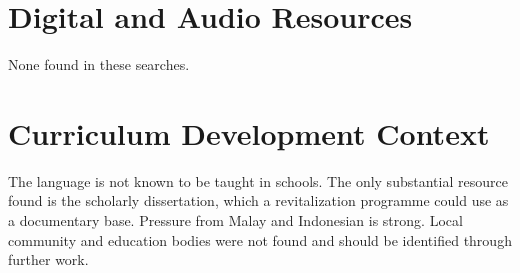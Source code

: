 \documentclass[12pt]{article}
\begin{document}
\section{Digital and Audio Resources}
None found in these searches.

\section{Curriculum Development Context}
The language is not known to be taught in schools. The only substantial resource found is the scholarly dissertation, which a revitalization programme could use as a documentary base. Pressure from Malay and Indonesian is strong. Local community and education bodies were not found and should be identified through further work.
\end{document}
